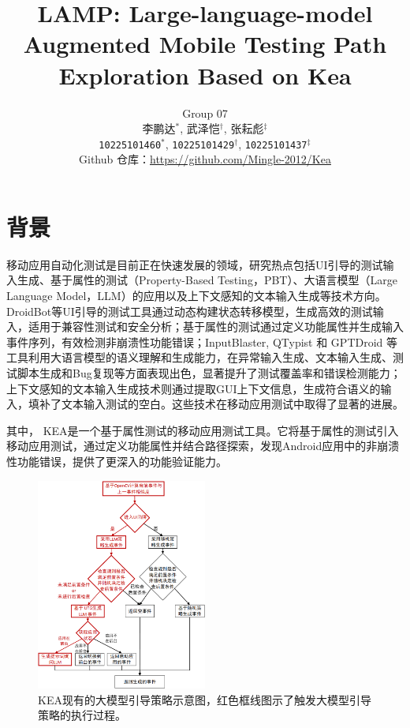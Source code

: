 \documentclass[twocolumn, 10pt]{article}
\title{\fontspec{Times New Roman} LAMP: Large-language-model Augmented Mobile Testing Path Exploration Based on Kea}
\author{
  Group 07\\
  李鹏达$^{*}$, 武泽恺$^{\dagger}$, 张耘彪$^{\ddagger}$\\
  \texttt{10225101460}$^{*}$, 
  \texttt{10225101429}$^{\dagger}$, 
  \texttt{10225101437}$^{\ddagger}$ \\
  Github 仓库：\url{https://github.com/Mingle-2012/Kea}
}
\date{}
\newcommand{\figureBelowMargin}{\vspace{-2pt}}
\newcommand{\kea}{K{\small\MakeUppercase{ea}}}
\begin{document}
\maketitle

\section{背景}

移动应用自动化测试是目前正在快速发展的领域，研究热点包括UI引导的测试输入生成、基于属性的测试（Property-Based Testing，PBT）、大语言模型（Large Language Model，LLM）的应用以及上下文感知的文本输入生成等技术方向。DroidBot\cite{li2017droidbot}等UI引导的测试工具通过动态构建状态转移模型，生成高效的测试输入，适用于兼容性测试和安全分析；基于属性的测试\cite{xiong2024general}通过定义功能属性并生成输入事件序列，有效检测非崩溃性功能错误；InputBlaster\cite{liu2024testing}, QTypist\cite{liu2023fill} 和 GPTDroid\cite{liu2024make} 等工具利用大语言模型的语义理解和生成能力，在异常输入生成、文本输入生成、测试脚本生成和Bug复现等方面表现出色，显著提升了测试覆盖率和错误检测能力；上下文感知的文本输入生成技术\cite{liu2023fill}则通过提取GUI上下文信息，生成符合语义的输入，填补了文本输入测试的空白。这些技术在移动应用测试中取得了显著的进展。

其中， \kea\cite{xiong2024general}是一个基于属性测试的移动应用测试工具。它将基于属性的测试引入移动应用测试，通过定义功能属性并结合路径探索，发现Android应用中的非崩溃性功能错误，提供了更深入的功能验证能力。

\begin{figure}[ht!]
    \centering
    \includegraphics[width=0.5\textwidth]{llm}
    \caption{\kea 现有的大模型引导策略示意图，红色框线图示了触发大模型引导策略的执行过程。}
    \figureBelowMargin
    \label{fig:llm}
\end{figure}
\end{document}
